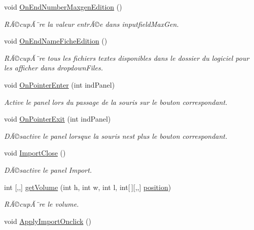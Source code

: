 \begin{DoxyCompactItemize}
void \mbox{\hyperlink{class_parameters_a4167680889821ca1d2f3bc487b0bebae}{On\+End\+Number\+Maxgen\+Edition}} ()
\begin{DoxyCompactList}\small\item\em RÃ©cupÃ¨re la valeur entrÃ©e dans inputfield\+Max\+Gen. \end{DoxyCompactList}\item 
void \mbox{\hyperlink{class_parameters_ad3db64cd1a228cb925a9afd7f32332a5}{On\+End\+Name\+Fiche\+Edition}} ()
\begin{DoxyCompactList}\small\item\em RÃ©cupÃ¨re tous les fichiers textes disponibles dans le dossier du logiciel pour les afficher dans dropdown\+Files. \end{DoxyCompactList}\item 
void \mbox{\hyperlink{class_parameters_aa0a97bc80e6c1cdf8a43513c187f33aa}{On\+Pointer\+Enter}} (int ind\+Panel)
\begin{DoxyCompactList}\small\item\em Active le panel lors du passage de la souris sur le bouton correspondant. \end{DoxyCompactList}\item 
void \mbox{\hyperlink{class_parameters_a711df8be88106725f5e1cf4bf74a5e21}{On\+Pointer\+Exit}} (int ind\+Panel)
\begin{DoxyCompactList}\small\item\em DÃ©sactive le panel lorsque la souris n\textquotesingle{}est plus le bouton correspondant. \end{DoxyCompactList}\item 
void \mbox{\hyperlink{class_parameters_a95a34ed3f54953655b8caf704caff1f5}{Import\+Close}} ()
\begin{DoxyCompactList}\small\item\em DÃ©sactive le panel Import. \end{DoxyCompactList}\item 
int \mbox{[},,\mbox{]} \mbox{\hyperlink{class_parameters_a5e16007361a29535bbad70f4f0a466bc}{get\+Volume}} (int h, int w, int l, int\mbox{[}$\,$\mbox{]}\mbox{[},,\mbox{]} \mbox{\hyperlink{class_parameters_ad01c1db17d90b97c666abf21a9c6fcd1}{position}})
\begin{DoxyCompactList}\small\item\em RÃ©cupÃ¨re le volume. \end{DoxyCompactList}\item 
void \mbox{\hyperlink{class_parameters_a8438e2686a572fc6d1cc2947489da01d}{Apply\+Import\+Onclick}} ()

\end{DoxyCompactItemize}
